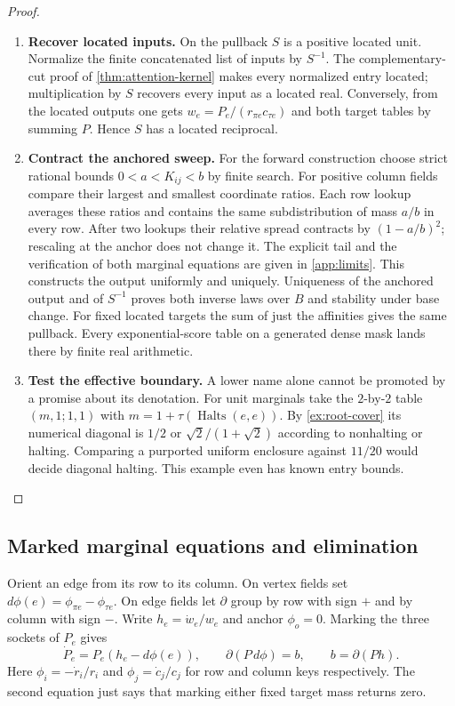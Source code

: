 \documentclass[11pt,a4paper]{article}
\theoremstyle{definition}
\theoremstyle{remark}\newaliascnt{remark}{theorem}
\numberwithin{equation}{section}
\begin{document}
\begin{proof}\leavevmode
\begin{enumerate}[titledsteps]
    \item \textbf{Recover located inputs.} On the pullback $S$ is a positive located unit. Normalize the finite concatenated list of inputs by $S^{-1}$. The complementary-cut proof of \cref{thm:attention-kernel} makes every normalized entry located; multiplication by $S$ recovers every input as a located real. Conversely, from the located outputs one gets $w_e=P_e/(r_{\pi e}c_{\tau e})$ and both target tables by summing $P$. Hence $S$ has a located reciprocal. 
    \item \textbf{Contract the anchored sweep.} For the forward construction choose strict rational bounds $0<a<K_{ij}<b$ by finite search. For positive column fields compare their largest and smallest coordinate ratios. Each row lookup averages these ratios and contains the same subdistribution of mass $a/b$ in every row. After two lookups their relative spread contracts by $(1-a/b)^2$; rescaling at the anchor does not change it. The explicit tail and the verification of both marginal equations are given in \cref{app:limits}. This constructs the output uniformly and uniquely. Uniqueness of the anchored output and of $S^{-1}$ proves both inverse laws over $B$ and stability under base change. For fixed located targets the sum of just the affinities gives the same pullback. Every exponential-score table on a generated dense mask lands there by finite real arithmetic. 
    \item \textbf{Test the effective boundary.} A lower name alone cannot be promoted by a promise about its denotation. For unit marginals take the $2$-by-$2$ table $(m,1;1,1)$ with $m=1+\tau(\operatorname{Halts}(e,e))$. By \cref{ex:root-cover} its numerical diagonal is $1/2$ or $\sqrt2/(1+\sqrt2)$ according to nonhalting or halting. Comparing a purported uniform enclosure against $11/20$ would decide diagonal halting. This example even has known entry bounds.\qedhere
\end{enumerate}
\end{proof}

\subsection{Marked marginal equations and elimination}

Orient an edge from its row to its column. On vertex fields set $d\phi(e)=\phi_{\pi e}-\phi_{\tau e}$. On edge fields let $\partial$ group by row with sign $+$ and by column with sign $-$. Write $h_e=\dot w_e/w_e$ and anchor $\phi_o=0$. Marking the three sockets of $P_e$ gives
\[
 \dot P_e=P_e(h_e-d\phi(e)),\qquad
 \partial(P\,d\phi)=b,\qquad b=\partial(Ph).
\]
Here $\phi_i=-\dot r_i/r_i$ and $\phi_j=\dot c_j/c_j$ for row and column keys respectively. The second equation just says that marking either fixed target mass returns zero.
\end{document}
